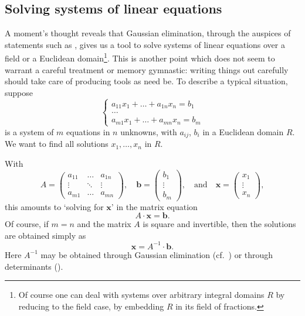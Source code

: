 \subsection{Solving systems of linear equations}
\label{subsec:linalg:solving-systems-of-linear-equations}
A moment's thought reveals that Gaussian elimination, through the
auspices of statements such as , gives us a tool to
solve systems of linear equations over a field or a Euclidean
domain\footnote{Of course one can deal with systems over arbitrary
  integral domains $R$ by reducing to the field case, by embedding $R$
  in its field of fractions.}. This is another point which does not
seem to warrant a careful treatment or memory gymnastic: writing
things out carefully should take care of producing tools as need
be. To describe a typical situation, suppose
\[
  \begin{cases}
    a_{11}x_1 + \dots + a_{1n}x_n = b_1 \\
    \dots \\
    a_{m1}x_1 + \dots + a_{mn}x_n = b_m
  \end{cases}
\]
is a system of $m$ equations in $n$ unknowns, with $a_{ij}$, $b_i$ in
a Euclidean domain $R$. We want to find all solutions
$x_1, \dots, x_n$ in $R$.

With
\[
  A = \begin{pmatrix} a_{11} & \dots & a_{1n} \\ \vdots & \ddots &
    \vdots \\ a_{m1} & \dots & a_{mn} \end{pmatrix}, \quad \mathbf{b}
  = \begin{pmatrix} b_1 \\ \vdots \\ b_m \end{pmatrix}, \quad
  \text{and} \quad \mathbf{x} = \begin{pmatrix} x_1 \\ \vdots \\
    x_n \end{pmatrix},
\]
this amounts to `solving for $\mathbf{x}$' in the matrix equation
\[
  A \cdot \mathbf{x} = \mathbf{b}.
\]
Of course, if $m = n$ and the matrix $A$ is square and invertible,
then the solutions are obtained simply as
\[
  \mathbf{x} = A^{-1} \cdot \mathbf{b}.
\]
Here $A^{-1}$ may be obtained through Gaussian elimination (cf.\
) or through determinants
(\Cref{subsec:linalg:the-determinant}).

